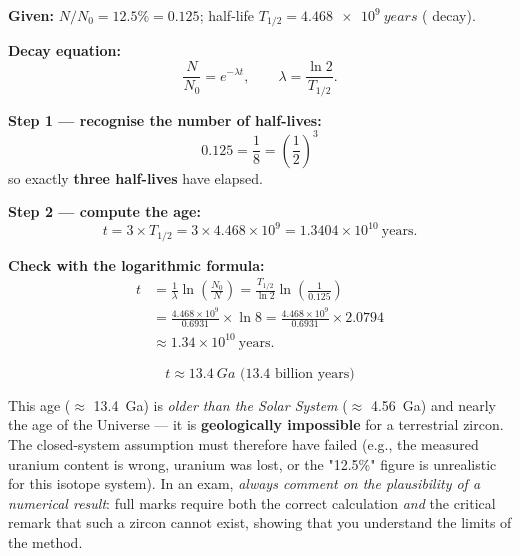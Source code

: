 \documentclass[11pt]{article}
\begin{document}
\begin{corrige}
\textbf{Given:} $N/N_0 = 12.5\% = 0.125$; half-life $T_{1/2} = \SI{4.468e9}{years}$ ( decay).

\textbf{Decay equation:}
\[
\frac{N}{N_0} = e^{-\lambda t}, \qquad \lambda = \frac{\ln 2}{T_{1/2}}.
\]

\textbf{Step 1 — recognise the number of half-lives:}
\[
0.125 = \frac{1}{8} = \left(\frac{1}{2}\right)^3
\]
so exactly \textbf{three half-lives} have elapsed.

\textbf{Step 2 — compute the age:}
\[
t = 3 \times T_{1/2} = 3 \times 4.468\times 10^{9} = 1.3404\times 10^{10}\ \text{years}.
\]

\textbf{Check with the logarithmic formula:}
\begin{align*}
t &= \frac{1}{\lambda}\ln\!\left(\frac{N_0}{N}\right) = \frac{T_{1/2}}{\ln 2}\ln\!\left(\frac{1}{0.125}\right)\\
&= \frac{4.468\times 10^{9}}{0.6931}\times \ln 8
= \frac{4.468\times 10^{9}}{0.6931}\times 2.0794\\
&\approx 1.34\times 10^{10}\ \text{years}.
\end{align*}

\[
\boxed{t \approx \SI{13.4}{Ga} \text{ (13.4 billion years)}}
\]

\begin{attention}
This age ($\approx$ \SI{13.4}{Ga}) is \emph{older than the Solar System} ($\approx$ \SI{4.56}{Ga}) and nearly the age of the Universe — it is \textbf{geologically impossible} for a terrestrial zircon. The closed-system assumption must therefore have failed (e.g., the measured uranium content is wrong, uranium was lost, or the "12.5\%" figure is unrealistic for this isotope system). In an exam, \emph{always comment on the plausibility of a numerical result}: full marks require both the correct calculation \emph{and} the critical remark that such a zircon cannot exist, showing that you understand the limits of the method.
\end{attention}
\end{corrige}
\end{document}

